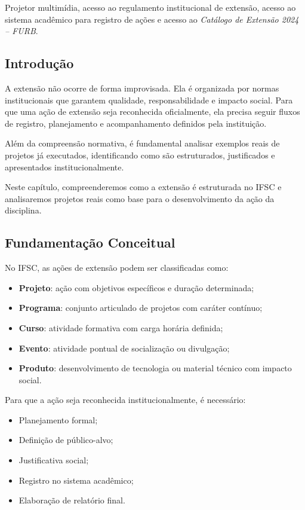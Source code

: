 \documentclass[12pt,a4paper]{article}
\begin{document}
Projetor multimídia, acesso ao regulamento institucional de extensão, acesso ao sistema acadêmico para registro de ações e acesso ao \textit{Catálogo de Extensão 2024 – FURB}.

\subsection*{Introdução}

A extensão não ocorre de forma improvisada. 
Ela é organizada por normas institucionais que garantem qualidade, responsabilidade e impacto social. Para que uma ação de extensão seja reconhecida oficialmente, ela precisa seguir fluxos de registro, planejamento e acompanhamento definidos pela instituição.

Além da compreensão normativa, é fundamental analisar exemplos reais de projetos já executados, identificando como são estruturados, justificados e apresentados institucionalmente.

Neste capítulo, compreenderemos como a extensão é estruturada no IFSC e analisaremos projetos reais como base para o desenvolvimento da ação da disciplina.

\subsection*{Fundamentação Conceitual}

No IFSC, as ações de extensão podem ser classificadas como:

\begin{itemize}
    \item \textbf{Projeto}: ação com objetivos específicos e duração determinada;
    \item \textbf{Programa}: conjunto articulado de projetos com caráter contínuo;
    \item \textbf{Curso}: atividade formativa com carga horária definida;
    \item \textbf{Evento}: atividade pontual de socialização ou divulgação;
    \item \textbf{Produto}: desenvolvimento de tecnologia ou material técnico com impacto social.
\end{itemize}

Para que a ação seja reconhecida institucionalmente, é necessário:

\begin{itemize}
    \item Planejamento formal;
    \item Definição de público-alvo;
    \item Justificativa social;
    \item Registro no sistema acadêmico;
    \item Elaboração de relatório final.
\end{itemize}
\end{document}

